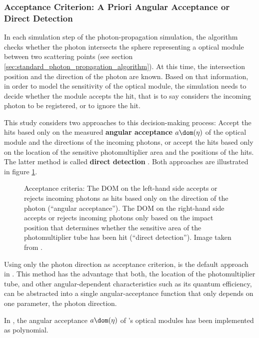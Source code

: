 \FloatBarrier
\subsubsection{Acceptance Criterion: A Priori Angular Acceptance or Direct Detection}
\label{sec:acception_criterion}\label{sec:a_priori_angular_acceptance}
\label{sec:direct_detection}

In each simulation step of the photon-propagation simulation, the algorithm checks whether the photon intersects the sphere representing a optical module between two scattering points (see section \ref{sec:standard_photon_propagation_algorithm}). At this time, the intersection position and the direction of the photon are known. Based on that information, in order to model the sensitivity of the optical module, the simulation needs to decide whether the module accepts the hit, that is to say considers the incoming photon to be registered, or to ignore the hit.

This study considers two approaches to this decision-making process: Accept the hits based only on the measured \textbf{angular acceptance} $a\dom(\eta)$ of the optical module and the directions of the incoming photons, or accept the hits based only on the location of the sensitive photomultiplier area and the positions of the hits. The latter method is called \textbf{direct detection} \cite{martinspicehddard}. Both approaches are illustrated in figure \ref{fig:kieQuoh1}.

\begin{figure}[htbp]
  \centering
  \caption{Acceptance criteria: The DOM on the left-hand side accepts or rejects incoming photons as hits based only on the direction of the photon (``angular acceptance''). The DOM on the right-hand side accepts or rejects incoming photons only based on the impact position that determines whether the sensitive area of the photomultiplier tube has been hit (``direct detection''). Image taken from \cite[slide 17]{martinspicehddard}.}
  \label{fig:kieQuoh1}
\end{figure}

Using only the photon direction as acceptance criterion, is the default approach in \clsim. This method has the advantage that both, the location of the photomultiplier tube, and other angular-dependent characteristics such as its quantum efficiency, can be abstracted into a single angular-acceptance function that only depends on one parameter, the photon direction.

In \clsim, the angular acceptance $a\dom(\eta)$ of \icecube's optical modules has been implemented as polynomial.

